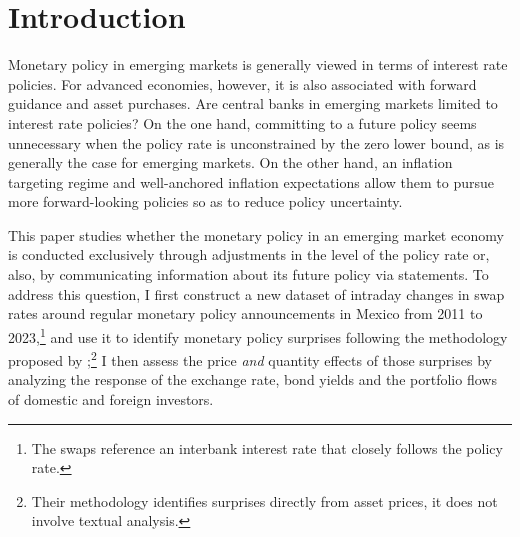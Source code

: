 \documentclass[a4paper, 12pt]{article}
\begin{document}
\section{Introduction}
Monetary policy in emerging markets is generally viewed in terms of interest rate policies. For advanced economies, however, it is also associated with forward guidance and asset purchases. Are central banks in emerging markets limited to interest rate policies? On the one hand, committing to a future policy seems unnecessary when the policy rate is unconstrained by the zero lower bound, as is generally the case for emerging markets. On the other hand, an inflation targeting regime and well-anchored inflation expectations allow them to pursue more forward-looking policies so as to reduce policy uncertainty. 

This paper studies whether the monetary policy in an emerging market economy is conducted exclusively through adjustments in the level of the policy rate or, also, by communicating information about its future policy via statements. 
To address this question, I first construct a new dataset of intraday changes in swap rates around regular monetary policy announcements in Mexico from 2011 to 2023,\footnote{The swaps reference an interbank interest rate that closely follows the policy rate.} and use it to identify monetary policy surprises following the methodology proposed by \textcite{GSS:2005a};\footnote{Their methodology identifies surprises directly from asset prices, it does not involve textual analysis.} 
I then assess the price \textit{and} quantity effects of those surprises by analyzing the response of the exchange rate, bond yields and the portfolio flows of domestic and foreign investors.
\end{document}
